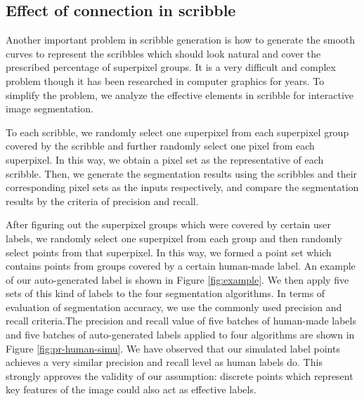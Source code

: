 \documentclass[runningheads,a4paper]{llncs}
\begin{document}
\subsection{Effect of connection in scribble}

Another important problem in scribble generation is how to generate the smooth curves to represent the scribbles which should look natural and cover the prescribed percentage of superpixel groups. It is a very difficult and complex problem though it has been researched in computer graphics for years. To simplify the problem, we analyze the effective elements in scribble for interactive image segmentation.

To each scribble, we randomly select one superpixel from each superpixel group covered by the scribble and further randomly select one pixel from each superpixel. In this way, we obtain a pixel set as the representative of each scribble. Then, we generate the segmentation results using the scribbles and their corresponding pixel sets as the inputs respectively, and compare the segmentation results by the criteria of precision and recall.


After figuring out the superpixel groups which were covered by certain user labels, we randomly select one superpixel from each group and then randomly select points from that superpixel. In this way, we formed a point set which contains points from groups covered by a certain human-made label. An example of our auto-generated label is shown in Figure \ref{fig:example}.  We then apply five sets of this kind of labels to the four segmentation algorithms. In terms of evaluation of segmentation accuracy, we use the commonly used precision and recall criteria.The precision and recall value of five batches of human-made labels and five batches of auto-generated labels applied to four algorithms are shown in Figure \ref{fig:pr-human-simu}. We have observed that our simulated label points achieves a very similar precision and recall level as human labels do. This strongly approves the validity of our assumption: discrete points which represent key features of the image could also act as effective labels.


\end{document}
